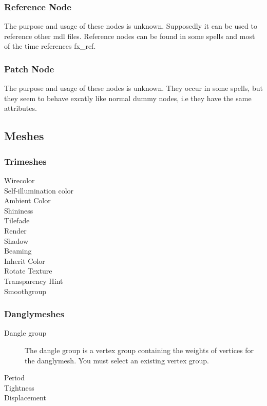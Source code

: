 \subsubsection{Reference Node}
The purpose and usage of these nodes is unknown. Supposedly it can be used to
reference other mdl files. Reference nodes can be found in some spells and
most of the time references fx\_ref.

\subsubsection{Patch Node}
The purpose and usage of these nodes is unknown. They occur in some spells, but
they seem to behave excatly like normal dummy nodes, i.e they have the same
attributes.

\subsection{Meshes}

\subsubsection{Trimeshes}

\begin{description}
    \item[Wirecolor]
    \item[Self-illumination color]
    \item[Ambient Color]
    \item[Shininess]
    \item[Tilefade]
    \item[Render]
    \item[Shadow]
    \item[Beaming]
    \item[Inherit Color]
    \item[Rotate Texture]
    \item[Transparency Hint]
    \item[Smoothgroup]
\end{description}

\subsubsection{Danglymeshes}
\begin{description}
    \item[Dangle group] The dangle group is a vertex group containing the weights of vertices for the danglymesh. You must select an existing vertex group.
    \item[Period]
    \item[Tightness]
    \item[Displacement]
\end{description}

